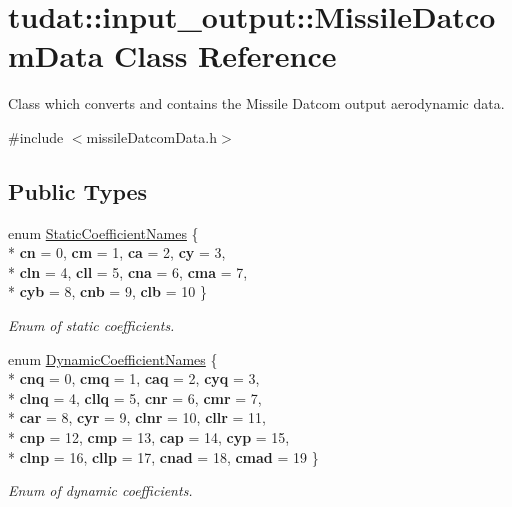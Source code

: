 \hypertarget{classtudat_1_1input__output_1_1MissileDatcomData}{}\section{tudat\+:\+:input\+\_\+output\+:\+:Missile\+Datcom\+Data Class Reference}
\label{classtudat_1_1input__output_1_1MissileDatcomData}


Class which converts and contains the Missile Datcom output aerodynamic data.  




{\ttfamily \#include $<$missile\+Datcom\+Data.\+h$>$}

\subsection*{Public Types}
\begin{DoxyCompactItemize}
\item 
enum \hyperlink{classtudat_1_1input__output_1_1MissileDatcomData_a59f58b6a3d2b3eaf142d8dae05aff805}{Static\+Coefficient\+Names} \{ \\*
{\bfseries cn} = 0, 
{\bfseries cm} = 1, 
{\bfseries ca} = 2, 
{\bfseries cy} = 3, 
\\*
{\bfseries cln} = 4, 
{\bfseries cll} = 5, 
{\bfseries cna} = 6, 
{\bfseries cma} = 7, 
\\*
{\bfseries cyb} = 8, 
{\bfseries cnb} = 9, 
{\bfseries clb} = 10
 \}\begin{DoxyCompactList}\small\item\em Enum of static coefficients. \end{DoxyCompactList}
\item 
enum \hyperlink{classtudat_1_1input__output_1_1MissileDatcomData_a93b8790c7c2d450f94483c2f67dace70}{Dynamic\+Coefficient\+Names} \{ \\*
{\bfseries cnq} = 0, 
{\bfseries cmq} = 1, 
{\bfseries caq} = 2, 
{\bfseries cyq} = 3, 
\\*
{\bfseries clnq} = 4, 
{\bfseries cllq} = 5, 
{\bfseries cnr} = 6, 
{\bfseries cmr} = 7, 
\\*
{\bfseries car} = 8, 
{\bfseries cyr} = 9, 
{\bfseries clnr} = 10, 
{\bfseries cllr} = 11, 
\\*
{\bfseries cnp} = 12, 
{\bfseries cmp} = 13, 
{\bfseries cap} = 14, 
{\bfseries cyp} = 15, 
\\*
{\bfseries clnp} = 16, 
{\bfseries cllp} = 17, 
{\bfseries cnad} = 18, 
{\bfseries cmad} = 19
 \}\begin{DoxyCompactList}\small\item\em Enum of dynamic coefficients. \end{DoxyCompactList}
\end{DoxyCompactItemize}
